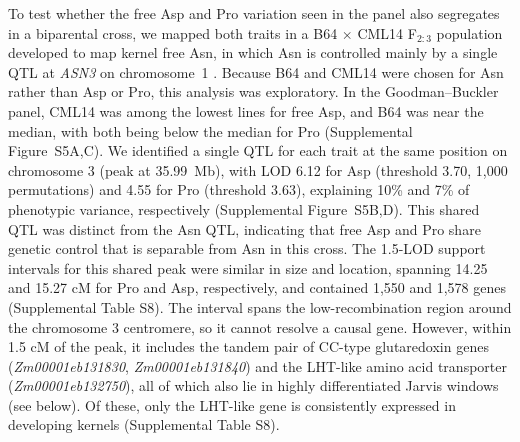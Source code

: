 \documentclass[namedate,unnumsec,webpdf,contemporary,large]{oup-authoring-template}
\begin{document}
To test whether the free Asp and Pro variation seen in the panel also segregates in a biparental cross, we mapped both traits in a B64 $\times$ CML14 F$_{2:3}$ population developed to map kernel free Asn, in which Asn is controlled mainly by a single QTL at \textit{ASN3} on chromosome~1 \citep{Fitzsimmons2026KernelKitchen}. Because B64 and CML14 were chosen for Asn rather than Asp or Pro, this analysis was exploratory. In the Goodman--Buckler panel, CML14 was among the lowest lines for free Asp, and B64 was near the median, with both being below the median for Pro (Supplemental Figure~S5A,C). We identified a single QTL for each trait at the same position on chromosome 3 (peak at 35.99~Mb), with LOD 6.12 for Asp (threshold 3.70, 1,000 permutations) and 4.55 for Pro (threshold 3.63), explaining 10\% and 7\% of phenotypic variance, respectively (Supplemental Figure~S5B,D). This shared QTL was distinct from the Asn QTL, indicating that free Asp and Pro share genetic control that is separable from Asn in this cross. The 1.5-LOD support intervals for this shared peak were similar in size and location, spanning 14.25 and 15.27 cM for Pro and Asp, respectively, and contained 1,550 and 1,578 genes (Supplemental Table S8). The interval spans the low-recombination region around the chromosome 3 centromere, so it cannot resolve a causal gene. However, within 1.5 cM of the peak, it includes the tandem pair of CC-type glutaredoxin genes (\textit{Zm00001eb131830}, \textit{Zm00001eb131840}) and the LHT-like amino acid transporter (\textit{Zm00001eb132750}), all of which also lie in highly differentiated Jarvis windows (see below). Of these, only the LHT-like gene is consistently expressed in developing kernels (Supplemental Table S8).

\end{document}
